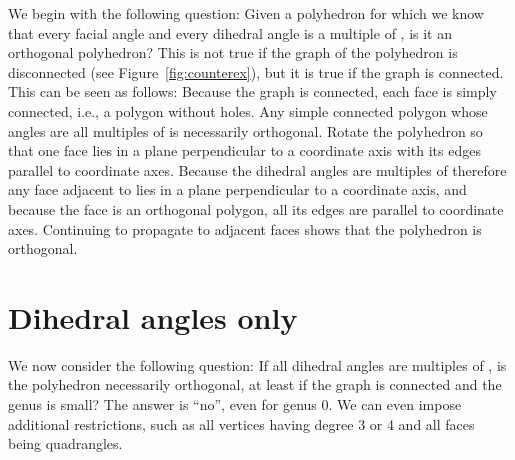 \documentclass[12pt]{article}
\begin{document}
We begin with the following question: Given a polyhedron
for which we know that every facial angle and every dihedral angle is
a multiple of , is it an orthogonal polyhedron?  
This is not true if the graph of the polyhedron is disconnected
(see Figure~\ref{fig:counterex}), but it is true if the graph is
connected.  This can be seen as follows:  
Because the graph is connected, each face is simply connected, i.e., 
a polygon without holes.  Any simple connected polygon whose angles 
are all multiples 
of  is necessarily orthogonal.  Rotate the polyhedron so that 
one face  lies in a plane perpendicular to a coordinate axis with 
its edges parallel to coordinate axes.  Because the dihedral angles 
are multiples of  therefore any face adjacent to  lies in a 
plane perpendicular to a coordinate axis, and because the face is an 
orthogonal polygon, all  its edges are parallel to coordinate axes.   
Continuing to propagate to adjacent faces shows that the polyhedron is orthogonal.

\iffalse
\footnote{TB: If anyone can
think of a shorter way of describing this, please change what's here.}
Initially pick one facial angle that is not  and rotate the 
polyhedron its two incident edges  are parallel to coordinate axes.  
Let 
be the common endpoint of , let  be the edge after  at , and
let (for )  be the face between  and .
Face  is in
the plane spanned by  and , hence perpendicular to a coordinate
axis.  Since the dihedral angle at  is a multiple of  and 
is parallel to a coordinate axis, hence  is perpendicular to a 
coordinate axis.  Since the facial angle  is a multiple of ,
 is parallel to a coordinate axis.  Continuing the argument, all faces
and edges at  are perpendicular/parallel to a coordinate axis.  Now consider
the other end  of .  The two incident faces  of  are
perpendicular to a coordinate axis, and the facial angles at  and 
are multiples of , so the edge before and after  at  are
also parallel to coordinate axes.  Now we repeat the argument at , and 
from there along incident edges to the rest of the graph, which reaches
all faces since the graph is connected.  So all faces/edges are 
perpendicular/parallel to coordinate axes as desired.
\fi

\section{Dihedral angles only}

We now consider the following question:  If all dihedral angles are
multiples of , is the polyhedron necessarily orthogonal, at
least if the graph is connected and the genus is small?  
The answer is ``no'', even for genus 0.  We can
even impose additional restrictions, such as all vertices having degree 3
or 4 and all faces being quadrangles.
\end{document}

